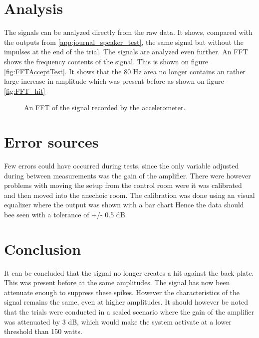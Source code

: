 \section{Analysis}

The signals can be analyzed directly from the raw data. It shows, compared with the outputs from \autoref{app:journal_speaker_test}, the same signal but without the impulses at the end of the trial. The signals are analyzed even further. An FFT shows the frequency contents of the signal. This is shown on figure \autoref{fig:FFTAcceptTest}. It shows that the 80 Hz area no longer contains an rather large increase in amplitude which was present before as shown on figure \ref{fig:FFT_hit}

\begin{figure}[H]
	\centering
	
	\caption{An FFT of the signal recorded by the accelerometer.}
	\label{fig:FFTAcceptTest}
\end{figure}

\section{Error sources}

Few errors could have occurred during tests, since the only variable adjusted during between measurements was the gain of the amplifier. There were however problems with moving the setup from the control room were it was calibrated and then moved into the anechoic room. The calibration was done using an visual equalizer where the output was shown with a bar chart Hence the data should bee seen with a tolerance of +/- 0.5 dB.


\section{Conclusion}

It can be concluded that the signal no longer creates a hit against the back plate. This was present before at the same amplitudes. The signal has now been attenuate enough to suppress these spikes. However the characteristics of the signal remains the same, even at higher amplitudes. It should however be noted that the trials were conducted in a scaled scenario where the gain of the amplifier was attenuated by 3 dB, which would make the system activate at a lower threshold than 150 watts.  
